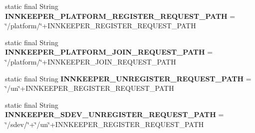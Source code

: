 \begin{DoxyCompactItemize}
\item 
\mbox{\label{classeu_1_1h2020_1_1symbiote_1_1ssp_1_1constants_1_1InnkeeperRestControllerConstants_a0d1fd33ccca45696de73c302743aaed3}} 
static final String {\bfseries I\+N\+N\+K\+E\+E\+P\+E\+R\+\_\+\+P\+L\+A\+T\+F\+O\+R\+M\+\_\+\+R\+E\+G\+I\+S\+T\+E\+R\+\_\+\+R\+E\+Q\+U\+E\+S\+T\+\_\+\+P\+A\+TH} = \char`\"{}/platform/\char`\"{}+I\+N\+N\+K\+E\+E\+P\+E\+R\+\_\+\+R\+E\+G\+I\+S\+T\+E\+R\+\_\+\+R\+E\+Q\+U\+E\+S\+T\+\_\+\+P\+A\+TH
\item 
\mbox{\label{classeu_1_1h2020_1_1symbiote_1_1ssp_1_1constants_1_1InnkeeperRestControllerConstants_a8474733b7668d265ad972ebf6c7be766}} 
static final String {\bfseries I\+N\+N\+K\+E\+E\+P\+E\+R\+\_\+\+P\+L\+A\+T\+F\+O\+R\+M\+\_\+\+J\+O\+I\+N\+\_\+\+R\+E\+Q\+U\+E\+S\+T\+\_\+\+P\+A\+TH} = \char`\"{}/platform/\char`\"{}+I\+N\+N\+K\+E\+E\+P\+E\+R\+\_\+\+J\+O\+I\+N\+\_\+\+R\+E\+Q\+U\+E\+S\+T\+\_\+\+P\+A\+TH
\item 
\mbox{\label{classeu_1_1h2020_1_1symbiote_1_1ssp_1_1constants_1_1InnkeeperRestControllerConstants_a0adb36ad9cc75d1e340d363c64e122cf}} 
static final String {\bfseries I\+N\+N\+K\+E\+E\+P\+E\+R\+\_\+\+U\+N\+R\+E\+G\+I\+S\+T\+E\+R\+\_\+\+R\+E\+Q\+U\+E\+S\+T\+\_\+\+P\+A\+TH} = \char`\"{}/un\char`\"{}+I\+N\+N\+K\+E\+E\+P\+E\+R\+\_\+\+R\+E\+G\+I\+S\+T\+E\+R\+\_\+\+R\+E\+Q\+U\+E\+S\+T\+\_\+\+P\+A\+TH
\item 
\mbox{\label{classeu_1_1h2020_1_1symbiote_1_1ssp_1_1constants_1_1InnkeeperRestControllerConstants_a4a72f6fe8f69a662848c2c3e5dc8601c}} 
static final String {\bfseries I\+N\+N\+K\+E\+E\+P\+E\+R\+\_\+\+S\+D\+E\+V\+\_\+\+U\+N\+R\+E\+G\+I\+S\+T\+E\+R\+\_\+\+R\+E\+Q\+U\+E\+S\+T\+\_\+\+P\+A\+TH} = \char`\"{}/sdev/\char`\"{}+\char`\"{}/un\char`\"{}+I\+N\+N\+K\+E\+E\+P\+E\+R\+\_\+\+R\+E\+G\+I\+S\+T\+E\+R\+\_\+\+R\+E\+Q\+U\+E\+S\+T\+\_\+\+P\+A\+TH
\item 
\mbox{\label{classeu_1_1h2020_1_1symbiote_1_1ssp_1_1constants_1_1InnkeeperRestControllerConstants_a13d7657b17970fc4fb31e449bf3b56d3}} 

\end{DoxyCompactItemize}

